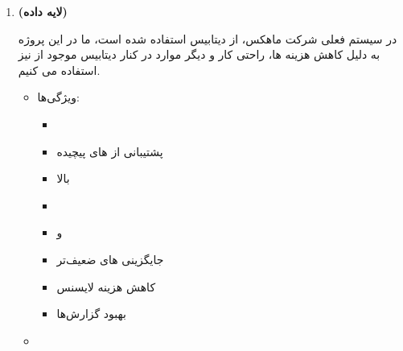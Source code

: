\documentclass[12pt,a4paper]{report}
\begin{document}
\begin{enumerate}
در پروژه‌های بزرگ، فایل‌ها (لاگ، تصویر، ویدیو، بکاپ، خروجی پردازش‌ها) نباید در  ذخیره شوند  بنابه این دلیل ما در این پروژه از  که در سیستم فعلی موجود بوده است استفاده خواهیم کرد.
\begin{itemize}
	\item 


\textbf{ویژگی‌ها:}
\begin{itemize}
	\item
سازگار با 
\item 
سبک و قابل استقرار 
\item 
سرعت بالا
\item 
مناسب برای 
\item 
جایگزینی های قدیمی
\item 
بدون وابستگی به  خارجی
\item 
مهاجرت ساده به  در آینده
\end{itemize}
\item
{}

\textbf{ویژگی‌ها:}
\begin{itemize}
	\item 
بسیار پایدار و مقیاس‌پذیر
 	\item 
هزینه بر اساس مصرف
	\item
امنیت و  بالا
	\item 
ابزارهای مدیریتی قوی
	\item 	
	 کردن  از دیتاسنتر داخلی
	\item کاهش هزینه نگهداری
\end{itemize}
\end{itemize}
\item 
\textbf{ (لایه داده)}
 
 در سیستم فعلی شرکت ماهکس، از دیتابیس  استفاده شده است، ما در این پروژه به دلیل کاهش هزینه ها، راحتی کار و دیگر موارد در کنار دیتابیس موجود  از  نیز استفاده می کنیم.
 \begin{itemize}
 	\item 
 

ویژگی‌ها:
\begin{itemize}
	\item 
{}
\item 
پشتیبانی از های پیچیده
\item 
{} بالا
\item 
{}
\item 
{} و 
\item 
جایگزینی های ضعیف‌تر
\item 
کاهش هزینه لایسنس
\item 
بهبود  گزارش‌ها
\end{itemize}
\item 
{}


\end{itemize}
\end{enumerate}
\end{document}
